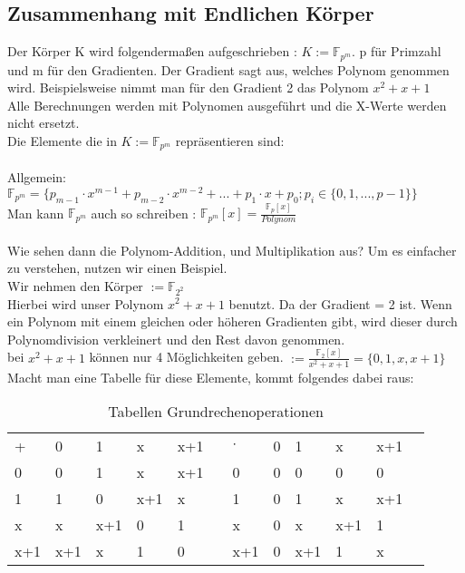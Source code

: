 \subsection{Zusammenhang mit Endlichen Körper}

Der Körper K wird folgendermaßen aufgeschrieben : $ K := \mathbb{F}_{p^m}$. p für Primzahl und m für den Gradienten. Der Gradient sagt aus, welches Polynom genommen wird. 
Beispielsweise nimmt man für den Gradient 2 das Polynom $x^2 + x + 1$\\
Alle Berechnungen werden mit Polynomen ausgeführt und die X-Werte werden nicht ersetzt.
\\
Die Elemente die in $ K := \mathbb{F}_{p^m}$ repräsentieren sind:\\
\\
Allgemein: $  \mathbb{F}_{p^m} = \{p_{m-1} \cdot x^{m-1} + p_{m-2} \cdot x^{m-2} + ... + p_1 \cdot x + p_0 ; p_i \in \{0,1,..., p-1\} \}$\\
Man kann $\mathbb{F}_{p^m}$ auch so schreiben : $\mathbb{F}_{p^m}[x] = \frac{\mathbb{F}_{p}[x]}{Polynom} $\\
\\
Wie sehen dann die Polynom-Addition, und Multiplikation aus? Um es einfacher zu verstehen, nutzen wir einen Beispiel.
\\
Wir nehmen den Körper $ := \mathbb{F}_{2^2}$
\\
Hierbei wird unser Polynom $ x^2+ x + 1 $ benutzt. Da der Gradient = 2 ist. Wenn ein Polynom mit einem gleichen oder höheren Gradienten gibt, wird dieser durch Polynomdivision verkleinert und den Rest davon genommen.\\
bei $ x^2+ x + 1 $ können nur 4 Möglichkeiten geben. $ := \frac{\mathbb{F}_{2}[x]}{x^2+ x + 1} = \{0, 1, x, x+1\}$\\

Macht man eine Tabelle für diese Elemente, kommt folgendes dabei raus:

\begin{table}[h]\caption{Tabellen Grundrechenoperationen}
    \begin{tabular}{l|l|l|l|lll|l|l|l|ll}
    +   & 0   & 1   & x   & x+1 &  & $\cdot$   & 0 & 1   & x   & x+1 &  \\ \cline{1-5} \cline{7-11}
    0   & 0   & 1   & x   & x+1 &  & 0   & 0 & 0   & 0   & 0   &  \\ \cline{1-5} \cline{7-11}
    1   & 1   & 0   & x+1 & x   &  & 1   & 0 & 1   & x   & x+1 &  \\ \cline{1-5} \cline{7-11}
    x   & x   & x+1 & 0   & 1   &  & x   & 0 & x   & x+1 & 1   &  \\ \cline{1-5} \cline{7-11}
    x+1 & x+1 & x   & 1   & 0   &  & x+1 & 0 & x+1 & 1   & x   & 
    \end{tabular}
\end{table}

